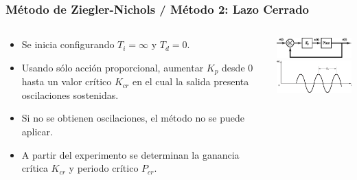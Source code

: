 \documentclass[aspectratio=169,handout]{beamer}
\theoremstyle{definition}
\theoremstyle{plain}
\theoremstyle{remark}
\begin{document}
\begin{frame}[<+->]\frametitle{Método de Ziegler-Nichols / Método 2: Lazo Cerrado}
\begin{columns}
\begin{column}{0.5\textwidth}
	\begin{itemize}
		\item Se inicia configurando $T_i = \infty$ y $T_d = 0$.
		\item Usando sólo acción proporcional, aumentar $K_p$ desde 0 hasta un valor crítico $K_{cr}$ en el cual la salida presenta oscilaciones sostenidas.
		\item Si no se obtienen oscilaciones, el método no se puede aplicar.
		\item A partir del experimento se determinan la ganancia crítica $K_{cr}$ y periodo crítico $P_{cr}$.
	\end{itemize}	
\end{column}	
\begin{column}{0.5\textwidth}
	\includegraphics[width=6.5cm]{images/zieglerNichols2a.eps}\\
	\vspace*{5mm}
	\includegraphics[width=6.5cm]{images/zieglerNichols2b.eps}
\end{column}	
\end{columns}
\end{frame}
\small
\end{document}
